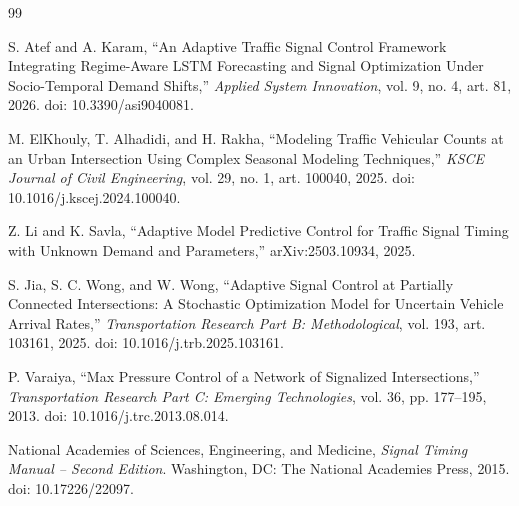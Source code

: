 \documentclass[letterpaper,12pt,conference]{ieeeconf}
\begin{document}
\begin{thebibliography}{99}

S. Atef and A. Karam,
``An Adaptive Traffic Signal Control Framework
Integrating Regime-Aware LSTM Forecasting and Signal
Optimization Under Socio-Temporal Demand Shifts,''
\textit{Applied System Innovation},
vol. 9, no. 4, art. 81, 2026.
doi: 10.3390/asi9040081.

M. ElKhouly, T. Alhadidi, and H. Rakha,
``Modeling Traffic Vehicular Counts at an Urban
Intersection Using Complex Seasonal Modeling Techniques,''
\textit{KSCE Journal of Civil Engineering},
vol. 29, no. 1, art. 100040, 2025.
doi: 10.1016/j.kscej.2024.100040.

Z. Li and K. Savla,
``Adaptive Model Predictive Control for Traffic Signal
Timing with Unknown Demand and Parameters,''
arXiv:2503.10934, 2025.

S. Jia, S. C. Wong, and W. Wong,
``Adaptive Signal Control at Partially Connected
Intersections: A Stochastic Optimization Model for
Uncertain Vehicle Arrival Rates,''
\textit{Transportation Research Part B: Methodological},
vol. 193, art. 103161, 2025.
doi: 10.1016/j.trb.2025.103161.

P. Varaiya,
``Max Pressure Control of a Network of Signalized
Intersections,''
\textit{Transportation Research Part C:
Emerging Technologies},
vol. 36, pp. 177--195, 2013.
doi: 10.1016/j.trc.2013.08.014.

National Academies of Sciences, Engineering, and Medicine,
\textit{Signal Timing Manual -- Second Edition}.
Washington, DC: The National Academies Press, 2015.
doi: 10.17226/22097.

\end{thebibliography}
\end{document}
